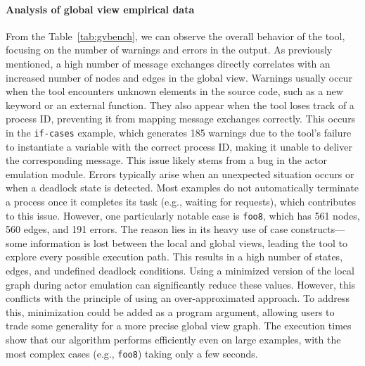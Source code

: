 \paragraph{Analysis of global view empirical data}
From the Table~\ref{tab:gvbench}, we can observe the overall behavior of the tool, 
focusing on the number of warnings and errors in the output. 
As previously mentioned, a high number of message exchanges directly correlates  
with an increased number of nodes and edges in the global view.
Warnings usually occur when the
tool encounters unknown elements in the source code, such as a new keyword or
an external function. They also appear when the tool loses track of a process
ID, preventing it from mapping message exchanges correctly. 
This occurs in the \texttt{if-cases} example, which generates 185 warnings due to
the tool's failure to instantiate a variable with the correct process ID, making
it unable to deliver the corresponding message. This issue likely stems from a
bug in the actor emulation module.
Errors typically arise when an unexpected situation occurs or when a deadlock
state is detected. Most examples do not automatically terminate a process once
it completes its task (e.g., waiting for requests), which contributes to this
issue. However, one particularly notable case is \texttt{foo8}, which has 561
nodes, 560 edges, and 191 errors. The reason lies in its heavy use of case
constructs—some information is lost between the local and global views, leading
the tool to explore every possible execution path. This results in a high number
of states, edges, and undefined deadlock conditions. 
Using a minimized version of the local graph during actor emulation can
significantly reduce these values. However, this conflicts with the principle
of using an over-approximated approach. To address this, minimization could be
added as a program argument, allowing users to trade some generality for a
more precise global view graph.
The execution times show that our algorithm performs efficiently even on large 
examples, with the most complex cases (e.g., \texttt{foo8}) taking only a few 
seconds.

